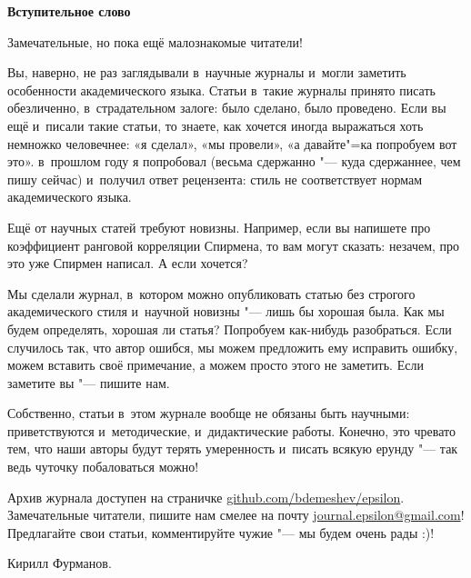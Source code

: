 \documentclass[11pt]{article}
\begin{document}
\pagestyle{empty}

\begin{center}
\Large\textbf{Вступительное слово}
\end{center}


Замечательные, но пока ещё малознакомые читатели!

Вы, наверно, не раз заглядывали в~научные журналы и~могли заметить особенности академического языка. Статьи в~такие журналы принято писать обезличенно, в~страдательном залоге: было сделано, было проведено. Если вы ещё и~писали такие статьи, то знаете, как хочется иногда выражаться хоть немножко человечнее: «я сделал», «мы провели», «а давайте"=ка попробуем вот это». в~прошлом году я попробовал (весьма сдержанно "--- куда сдержаннее, чем пишу сейчас) и~получил ответ рецензента: стиль не соответствует нормам академического языка.

Ещё от научных статей требуют новизны. Например, если вы напишете про коэффициент ранговой корреляции Спирмена, то вам могут сказать: незачем, про это уже Спирмен написал. А если хочется?

Мы сделали журнал, в~котором можно опубликовать статью без строгого академического стиля и~научной новизны "--- лишь бы хорошая была. Как мы будем определять, хорошая ли статья? Попробуем как-нибудь разобраться. Если случилось так, что автор ошибся, мы можем предложить ему исправить ошибку, можем вставить своё примечание, а можем просто этого не заметить. Если заметите вы "--- пишите нам.

Собственно, статьи в~этом журнале вообще не обязаны быть научными: приветствуются и~методические, и~дидактические работы. Конечно, это чревато тем, что наши авторы будут терять умеренность и~писать всякую ерунду "--- так ведь чуточку побаловаться можно!

Архив журнала доступен на страничке \href{http://bdemeshev.github.io/epsilon/}{github.com/bdemeshev/epsilon}. Замечательные читатели, пишите нам смелее на почту \href{mailto:journal.epsilon@gmail.com}{journal.epsilon@gmail.com}! Предлагайте свои статьи, комментируйте чужие "--- мы будем очень рады :)!


\begin{flushright}
Кирилл Фурманов.
\end{flushright}
\end{document}
